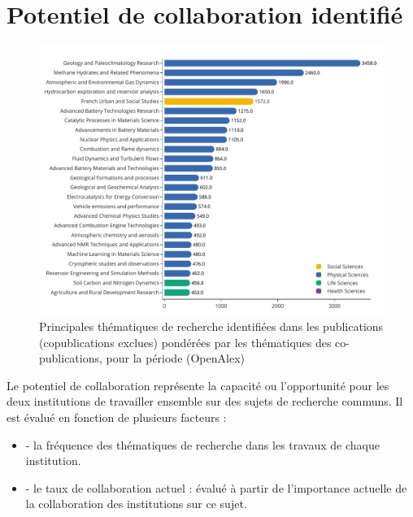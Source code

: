\documentclass[french, 11pt]{dibiso/pubpart}
\begin{document}
{\footnotesize\topicscollaborationsinfo}








\pagebreak

\section{Potentiel de collaboration identifié}

\begin{figure}[!h]
  \includegraphics[width=\textwidth]{figures/topics_potential_collaborations.pdf}
  \centering
  \caption{Principales thématiques de recherche identifiées dans les publications \entitiesacronym (copublications exclues) pondérées par les thématiques des co-publications, pour la période \reportyear (OpenAlex)}
  \label{fig_topics_potential_collaborations}
\end{figure}

{\footnotesize\topicspotentialcollaborationsinfo}

Le potentiel de collaboration représente la capacité ou l'opportunité pour les deux institutions de travailler ensemble sur des sujets de recherche communs. Il est évalué en fonction de plusieurs facteurs :

\begin{itemize}
    \item - la fréquence des thématiques de recherche dans les travaux de chaque institution.
    \item - le taux de collaboration actuel : évalué à partir de l'importance actuelle de la collaboration des institutions sur ce sujet.
\end{itemize}
\end{document}
